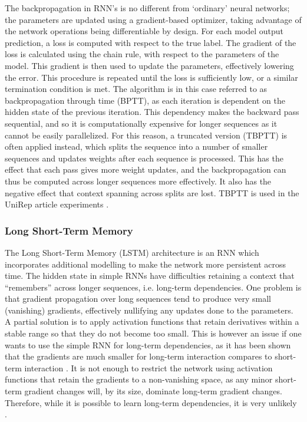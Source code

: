 \documentclass[a4paper,12pt]{article}
\begin{document}
The backpropagation in RNN's is no different from `ordinary' neural networks; the parameters are updated using a gradient-based optimizer, taking advantage of the network operations being differentiable by design. For each model output prediction, a loss is computed with respect to the true label. The gradient of the loss is calculated using the chain rule, with respect to the parameters of the model. This gradient is then used to update the parameters, effectively lowering the error. This procedure is repeated until the loss is sufficiently low, or a similar termination condition is met. The algorithm is in this case referred to as backpropagation through time (BPTT), as each iteration is dependent on the hidden state of the previous iteration. This dependency makes the backward pass sequential, and so it is computationally expensive for longer sequences as it cannot be easily parallelized. For this reason, a truncated version (TBPTT) is often applied instead, which splits the sequence into a number of smaller sequences and updates weights after each sequence is processed. This has the effect that each pass gives more weight updates, and the backpropagation can thus be computed across longer sequences more effectively. It also has the negative effect that context spanning across splits are lost. TBPTT is used in the UniRep article experiments \cite{alley2019unified}.

\subsubsection{Long Short-Term Memory}
\label{section:LSTM}
The Long Short-Term Memory (LSTM) architecture is an RNN which incorporates additional modelling to make the network more persistent across time. The hidden state in simple RNNs have difficulties retaining a context that ``remembers'' across longer sequences, i.e. long-term dependencies. One problem is that gradient propagation over long sequences tend to produce very small (vanishing) gradients, effectively nullifying any updates done to the parameters. A partial solution is to apply activation functions that retain derivatives within a stable range so that they do not become too small. This is however an issue if one wants to use the simple RNN for long-term dependencies, as it has been shown that the gradients are much smaller for long-term interaction compares to short-term interaction \cite{Goodfellow-et-al-2016}. It is not enough to restrict the network using activation functions that retain the gradients to a non-vanishing space, as any minor short-term gradient changes will, by its size, dominate long-term gradient changes. Therefore, while it is possible to learn long-term dependencies, it is very unlikely \cite{Goodfellow-et-al-2016}.
\end{document}
